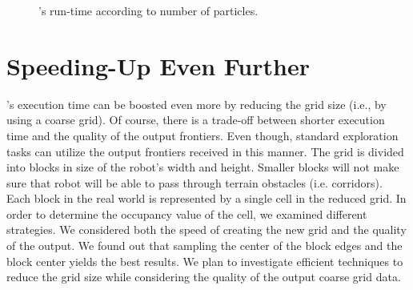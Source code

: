 \begin{figure}[htp]
{ }
 \caption{\FFD's run-time according to number of particles.}
 \label{fig:graph_ffd_run-time_vs_particle_numbers}
\end{figure}



\section{Speeding-Up \WFD Even Further}\label{section:wfd_speedup}
\WFD's execution time can be boosted even more by
reducing the grid size (i.e., by using a coarse grid). Of course, there is a
trade-off between shorter execution time and the quality of the output frontiers. Even though, standard
exploration tasks can utilize the output frontiers received in this manner.
The grid is divided into blocks in size of the robot's width and height.
Smaller blocks will not make sure that robot will be able to pass through
terrain obstacles (i.e. corridors). Each block in the real world is represented
by a single cell in the reduced grid. In order to determine the occupancy value
of the cell, we examined different strategies. We considered both the speed of
creating the new grid and the quality of the output.
We found out that sampling the center of the block edges and the
block center yields the best results. 
% 
We plan to investigate efficient techniques to reduce the grid size while
considering the quality of the output coarse grid data. 
